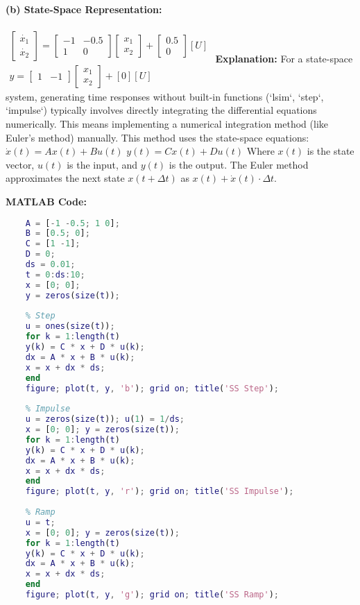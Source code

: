 \documentclass{article}
\begin{document}
	\paragraph{(b) State-Space Representation:}
	$\begin{array}{l} \begin{bmatrix} \dot{x_1} \\ \dot{x_2} \end{bmatrix} = \begin{bmatrix} -1 & -0.5 \\ 1 & 0 \end{bmatrix} \begin{bmatrix} x_1 \\ x_2 \end{bmatrix} + \begin{bmatrix} 0.5 \\ 0 \end{bmatrix} [U] \\ y = \begin{bmatrix} 1 & -1 \end{bmatrix} \begin{bmatrix} x_1 \\ x_2 \end{bmatrix} + [0] [U] \end{array}$
	\textbf{Explanation:}
	For a state-space system, generating time responses without built-in functions (`lsim`, `step`, `impulse`) typically involves directly integrating the differential equations numerically. This means implementing a numerical integration method (like Euler's method) manually. This method uses the state-space equations:
	$\dot{x}(t) = Ax(t) + Bu(t)$
	$y(t) = Cx(t) + Du(t)$
	Where $x(t)$ is the state vector, $u(t)$ is the input, and $y(t)$ is the output.
	The Euler method approximates the next state $x(t+\Delta t)$ as $x(t) + \dot{x}(t) \cdot \Delta t$.
	
	\textbf{MATLAB Code:}
	\begin{lstlisting}[language=Matlab, caption=MATLAB Code for Problem 3(b) (Numerical Integration for State-Space)]
	% Problem 3(b): State Space Euler Integration
	A = [-1 -0.5; 1 0];
	B = [0.5; 0];
	C = [1 -1];
	D = 0;
	ds = 0.01;
	t = 0:ds:10;
	x = [0; 0];
	y = zeros(size(t));
	
	% Step
	u = ones(size(t));
	for k = 1:length(t)
	y(k) = C * x + D * u(k);
	dx = A * x + B * u(k);
	x = x + dx * ds;
	end
	figure; plot(t, y, 'b'); grid on; title('SS Step');
	
	% Impulse
	u = zeros(size(t)); u(1) = 1/ds;
	x = [0; 0]; y = zeros(size(t));
	for k = 1:length(t)
	y(k) = C * x + D * u(k);
	dx = A * x + B * u(k);
	x = x + dx * ds;
	end
	figure; plot(t, y, 'r'); grid on; title('SS Impulse');
	
	% Ramp
	u = t;
	x = [0; 0]; y = zeros(size(t));
	for k = 1:length(t)
	y(k) = C * x + D * u(k);
	dx = A * x + B * u(k);
	x = x + dx * ds;
	end
	figure; plot(t, y, 'g'); grid on; title('SS Ramp');
	\end{lstlisting}
\end{document}
